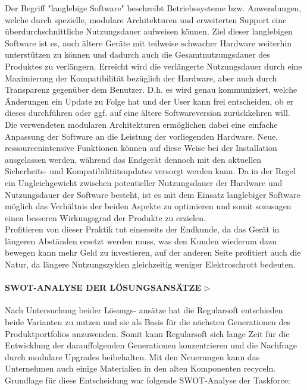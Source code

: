 \documentclass[13pt,titlepage]{article}
\begin{document}
\begin{itemize}
Der Begriff "langlebige Software" beschreibt Betriebssysteme bzw. Anwendungen, welche durch spezielle, modulare Architekturen und erweiterten Support eine überdurchschnittliche Nutzungsdauer aufweisen können. Ziel dieser langlebigen Software ist es, auch ältere Geräte mit teilweise schwacher Hardware weiterhin unterstützen zu können und dadurch auch die Gesamtnutzungsdauer des Produktes zu verlängern. Erreicht wird die verlängerte Nutzungsdauer durch eine Maximierung der Kompatibilität bezüglich der Hardware, aber auch durch Transparenz gegenüber dem Benutzer. D.h. es wird genau kommuniziert, welche Änderungen ein Update zu Folge hat und der User kann frei entscheiden, ob er dieses durchführen oder ggf. auf eine ältere Softwareversion zurückkehren will. Die verwendeten modularen Architekturen ermöglichen dabei eine einfache Anpassung der Software an die Leistung der vorliegenden Hardware. Neue, ressourcenintensive Funktionen können auf diese Weise bei der Installation ausgelassen werden, während das Endgerät dennoch mit den aktuellen Sicherheits- und Kompatibilitätsupdates versorgt werden kann. Da in der Regel ein Ungleichgewicht zwischen potentieller Nutzungsdauer der Hardware und Nutzungsdauer der Software besteht, ist es mit dem Einsatz langlebiger Software möglich das Verhältnis der beiden Aspekte zu optimieren und somit sozusagen einen besseren Wirkungsgrad der Produkte zu erzielen.\\
Profitieren von dieser Praktik tut einerseits der Endkunde, da das Gerät in längeren Abständen ersetzt werden muss, was den Kunden wiederum dazu bewegen kann mehr Geld zu investieren, auf der anderen Seite profitiert auch die Natur, da längere Nutzungszyklen gleichzeitig weniger Elektroschrott bedeuten. 
\end{itemize}

\newpage
\paragraph{\textbf{SWOT-ANALYSE DER LÖSUNGSANSÄTZE  $\triangleright$}}
Nach Untersuchung beider Lösungs- ansätze hat die Regularsoft entschieden beide Varianten zu nutzen und sie als Basis für die nächsten Generationen des Produktportfolios anzuwenden. Somit kann Regularsoft sich lange Zeit für die Entwicklung der darauffolgenden Generationen konzentrieren und die Nachfrage durch modulare Upgrades beibehalten. Mit den Neuerungen kann das Unternehmen auch einige Materialien in den alten Komponenten recyceln. Grundlage für diese Entscheidung war folgende SWOT-Analyse der Taskforce:\\
\end{document}
